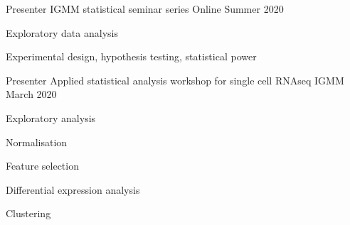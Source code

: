 


\begin{cventries}


\cventry
{Presenter} %
{IGMM statistical seminar series} %
{Online} %
{Summer 2020} %
{ %
  \begin{cvitems}
    \item {
      Exploratory data analysis
    }
    \item {
      Experimental design, hypothesis testing, statistical power
    }
  \end{cvitems}
}


\cventry
{Presenter} %
{Applied statistical analysis workshop for single cell RNAseq} %
{IGMM} %
{March 2020} %
{ %
  \begin{cvitems}
    \item 
      Exploratory analysis
    \item 
      Normalisation
    \item
      Feature selection
    \item
      Differential expression analysis
    \item
      Clustering
  \end{cvitems}
}






\end{cventries}
